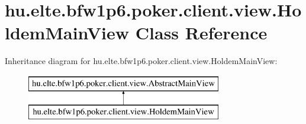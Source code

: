 \hypertarget{classhu_1_1elte_1_1bfw1p6_1_1poker_1_1client_1_1view_1_1_holdem_main_view}{}\section{hu.\+elte.\+bfw1p6.\+poker.\+client.\+view.\+Holdem\+Main\+View Class Reference}
\label{classhu_1_1elte_1_1bfw1p6_1_1poker_1_1client_1_1view_1_1_holdem_main_view}
Inheritance diagram for hu.\+elte.\+bfw1p6.\+poker.\+client.\+view.\+Holdem\+Main\+View\+:\begin{figure}[H]
\begin{center}
\leavevmode
\includegraphics[height=2.000000cm]{classhu_1_1elte_1_1bfw1p6_1_1poker_1_1client_1_1view_1_1_holdem_main_view}
\end{center}
\end{figure}
